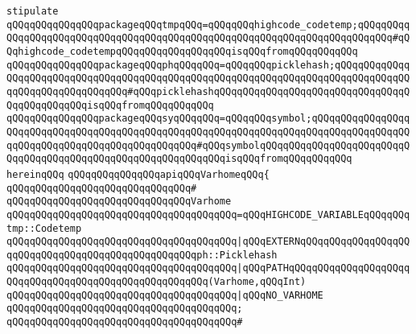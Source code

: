 \newline
\newline
\verb|stipulate|\newline
\verb|qQQqqQQqqQQqqQQqpackageqQQqtmpqQQq=qQQqqQQqhighcode_codetemp;qQQqqQQqqQQqqQQqqQQqqQQqqQQqqQQqqQQqqQQqqQQqqQQqqQQqqQQqqQQqqQQqqQQqqQQqqQQq#qQQqhighcode_codetempqQQqqQQqqQQqqQQqqQQqisqQQqfromqQQqqQQqqQQq|\newline
\verb|qQQqqQQqqQQqqQQqpackageqQQqphqQQqqQQq=qQQqqQQqpicklehash;qQQqqQQqqQQqqQQqqQQqqQQqqQQqqQQqqQQqqQQqqQQqqQQqqQQqqQQqqQQqqQQqqQQqqQQqqQQqqQQqqQQqqQQqqQQqqQQqqQQqqQQq#qQQqpicklehashqQQqqQQqqQQqqQQqqQQqqQQqqQQqqQQqqQQqqQQqqQQqqQQqisqQQqfromqQQqqQQqqQQq|\newline
\verb|qQQqqQQqqQQqqQQqpackageqQQqsyqQQqqQQq=qQQqqQQqsymbol;qQQqqQQqqQQqqQQqqQQqqQQqqQQqqQQqqQQqqQQqqQQqqQQqqQQqqQQqqQQqqQQqqQQqqQQqqQQqqQQqqQQqqQQqqQQqqQQqqQQqqQQqqQQqqQQqqQQqqQQq#qQQqsymbolqQQqqQQqqQQqqQQqqQQqqQQqqQQqqQQqqQQqqQQqqQQqqQQqqQQqqQQqqQQqqQQqisqQQqfromqQQqqQQqqQQq|\newline
\verb|hereinqQQq|\newline
\newline
\verb|qQQqqQQqqQQqqQQqapiqQQqVarhomeqQQq{|\newline
\verb|qQQqqQQqqQQqqQQqqQQqqQQqqQQqqQQq#|\newline
\newline
\verb|qQQqqQQqqQQqqQQqqQQqqQQqqQQqqQQqVarhome|\newline
\verb|qQQqqQQqqQQqqQQqqQQqqQQqqQQqqQQqqQQqqQQq=qQQqHIGHCODE_VARIABLEqQQqqQQqtmp::Codetemp|\newline
\verb|qQQqqQQqqQQqqQQqqQQqqQQqqQQqqQQqqQQqqQQq|\verb#|qQQqEXTERNqQQqqQQqqQQqqQQqqQQqqQQqqQQqqQQqqQQqqQQqqQQqqQQqqQQqph::Picklehash#\newline
\verb|qQQqqQQqqQQqqQQqqQQqqQQqqQQqqQQqqQQqqQQq|\verb#|qQQqPATHqQQqqQQqqQQqqQQqqQQqqQQqqQQqqQQqqQQqqQQqqQQqqQQqqQQqqQQq(Varhome,qQQqInt)#\newline
\verb|qQQqqQQqqQQqqQQqqQQqqQQqqQQqqQQqqQQqqQQq|\verb#|qQQqNO_VARHOME#\newline
\verb|qQQqqQQqqQQqqQQqqQQqqQQqqQQqqQQqqQQqqQQq;|\newline
\verb|qQQqqQQqqQQqqQQqqQQqqQQqqQQqqQQqqQQqqQQq#|\newline
